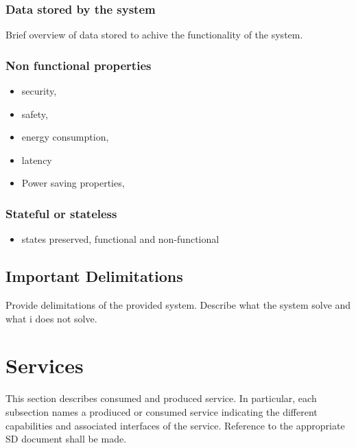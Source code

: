 \documentclass[a4paper]{arrowhead}
\begin{document}
\subsubsection {Data stored by the system}

Brief overview of data stored to achive the functionality of the system. 

\subsubsection {Non functional properties}

\begin{itemize}
  \item security, 
  \item safety, 
  \item energy consumption,
  \item latency
  \item Power saving properties, 
\end{itemize}

\subsubsection {Stateful or stateless}
\begin{itemize} 
\item states preserved, functional and non-functional
\end{itemize}  
\color{black}  


\subsection{Important Delimitations}
\label{sec:delimitations}

\color{red}
Provide delimitations of the provided system. Describe what the system
solve and what i does not solve.
\color{black}  



\newpage

\section{Services}
\label{sec:services}

\color{red}
This section describes consumed and produced service.
In particular, each subsection names a prodiuced or consumed service
indicating the different capabilities and associated interfaces of the
service. Reference to the appropriate SD document shall be made.
\color{black}
\end{document}
